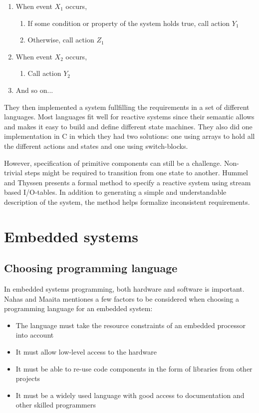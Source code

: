 \begin{enumerate}
\item
  When event $X_1$ occurs,
\begin{enumerate}
\item
  If some condition or property of the system holds true, call action $Y_1$
\item
  Otherwise, call action $Z_1$
\end{enumerate}

\item
  When event $X_2$ occurs,
\begin{enumerate}
\item
  Call action $Y_2$
\end{enumerate}

\item
  And so on...
\end{enumerate}

They then implemented a system fullfilling the requirements in a set of
different languages. Most languages fit well for reactive systems since their
semantic allows and makes it easy to build and define different state machines.
They also did one implementation in C in which they had two solutions: one
using arrays to hold all the different actions and states and one using
switch-blocks.

However, specification of primitive components can still be a challenge.
Non-trivial steps might be required to transition from one state to another.
Hummel and Thyssen \cite{hummel2009behavioral} presents a formal method to
specify a reactive system using stream based I/O-tables. In addition to
generating a simple and understandable description of the system, the method
helps formalize inconsistent requirements.

\section{Embedded systems}

\subsection{Choosing programming language}

In embedded systems programming, both hardware and software is important. Nahas
and Maaita \cite{nahas2012choosing} mentiones a few factors to be considered
when choosing a programming language for an embedded system:

\begin{itemize}
\item
  The language must take the resource constraints of an embedded processor
  into account
\item
  It must allow low-level access to the hardware
\item
  It must be able to re-use code components in the form of libraries from other
    projects
\item
  It must be a widely used language with good access to documentation and other
    skilled programmers
\end{itemize}

